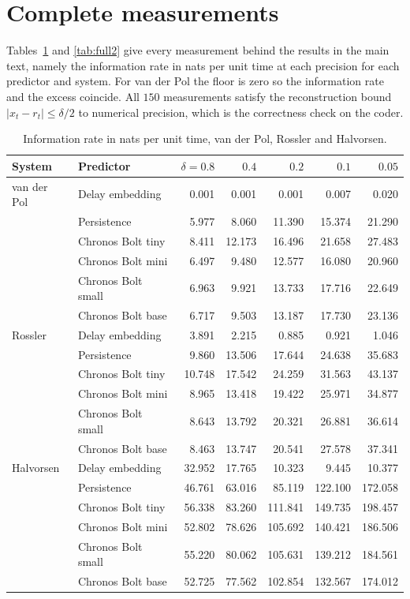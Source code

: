 \documentclass{article}
\begin{document}
\section{Complete measurements}

Tables~\ref{tab:full1} and \ref{tab:full2} give every measurement behind the results in the main text, namely the information rate in nats per unit time at each precision for each predictor and system. For van der Pol the floor is zero so the information rate and the excess coincide. All $150$ measurements satisfy the reconstruction bound $|x_t - r_t| \le \delta/2$ to numerical precision, which is the correctness check on the coder.

\begin{table}[h]
  \centering
  \caption{Information rate in nats per unit time, van der Pol, Rossler and Halvorsen.}
  \label{tab:full1}
  \small
  \begin{tabular}{llrrrrr}
    \toprule
    System & Predictor & $\delta = 0.8$ & $0.4$ & $0.2$ & $0.1$ & $0.05$ \\
    \midrule
    van der Pol & Delay embedding & 0.001 & 0.001 & 0.001 & 0.007 & 0.020 \\
    & Persistence & 5.977 & 8.060 & 11.390 & 15.374 & 21.290 \\
    & Chronos Bolt tiny & 8.411 & 12.173 & 16.496 & 21.658 & 27.483 \\
    & Chronos Bolt mini & 6.497 & 9.480 & 12.577 & 16.080 & 20.960 \\
    & Chronos Bolt small & 6.963 & 9.921 & 13.733 & 17.716 & 22.649 \\
    & Chronos Bolt base & 6.717 & 9.503 & 13.187 & 17.730 & 23.136 \\
    \midrule
    Rossler & Delay embedding & 3.891 & 2.215 & 0.885 & 0.921 & 1.046 \\
    & Persistence & 9.860 & 13.506 & 17.644 & 24.638 & 35.683 \\
    & Chronos Bolt tiny & 10.748 & 17.542 & 24.259 & 31.563 & 43.137 \\
    & Chronos Bolt mini & 8.965 & 13.418 & 19.422 & 25.971 & 34.877 \\
    & Chronos Bolt small & 8.643 & 13.792 & 20.321 & 26.881 & 36.614 \\
    & Chronos Bolt base & 8.463 & 13.747 & 20.541 & 27.578 & 37.341 \\
    \midrule
    Halvorsen & Delay embedding & 32.952 & 17.765 & 10.323 & 9.445 & 10.377 \\
    & Persistence & 46.761 & 63.016 & 85.119 & 122.100 & 172.058 \\
    & Chronos Bolt tiny & 56.338 & 83.260 & 111.841 & 149.735 & 198.457 \\
    & Chronos Bolt mini & 52.802 & 78.626 & 105.692 & 140.421 & 186.506 \\
    & Chronos Bolt small & 55.220 & 80.062 & 105.631 & 139.212 & 184.561 \\
    & Chronos Bolt base & 52.725 & 77.562 & 102.854 & 132.567 & 174.012 \\
    \bottomrule
  \end{tabular}
\end{table}
\end{document}
